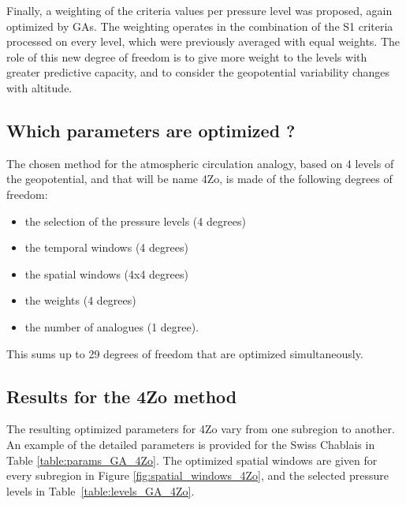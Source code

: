 \documentclass[review]{elsarticle}
\begin{document}
Finally, a weighting of the criteria values per pressure level was proposed, again optimized by GAs. The weighting operates in the combination of the S1 criteria processed on every level, which were previously averaged with equal weights. The role of this new degree of freedom is to give more weight to the levels with greater predictive capacity, and to consider the geopotential variability changes with altitude. 


\subsection{Which parameters are optimized ?}

The chosen method for the atmospheric circulation analogy, based on 4 levels of the geopotential, and that will be name 4Zo, is made of the following degrees of freedom:

\begin{itemize}
	\setlength\itemsep{-4px}
	\item the selection of the pressure levels (4 degrees)
	\item the temporal windows (4 degrees)
	\item the spatial windows (4x4 degrees)
	\item the weights (4 degrees)
	\item the number of analogues (1 degree).
\end{itemize}

This sums up to 29 degrees of freedom that are optimized simultaneously.


\subsection{Results for the 4Zo method}

The resulting optimized parameters for 4Zo vary from one subregion to another. An example of the detailed parameters is provided for the Swiss Chablais in Table \ref{table:params_GA_4Zo}. The optimized spatial windows are given for every subregion in Figure \ref{fig:spatial_windows_4Zo}, and the selected pressure levels in Table~\ref{table:levels_GA_4Zo}. 
\end{document}
